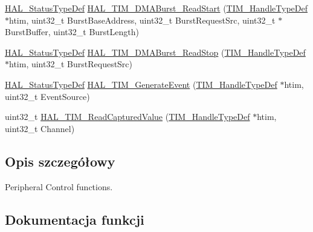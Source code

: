 \begin{DoxyCompactItemize}
\item 
\hyperlink{stm32f4xx__hal__def_8h_a63c0679d1cb8b8c684fbb0632743478f}{H\+A\+L\+\_\+\+Status\+Type\+Def} \hyperlink{group___t_i_m___exported___functions___group8_ga39c612c473747448615e2e3cb2668224}{H\+A\+L\+\_\+\+T\+I\+M\+\_\+\+D\+M\+A\+Burst\+\_\+\+Read\+Start} (\hyperlink{struct_t_i_m___handle_type_def}{T\+I\+M\+\_\+\+Handle\+Type\+Def} $\ast$htim, uint32\+\_\+t Burst\+Base\+Address, uint32\+\_\+t Burst\+Request\+Src, uint32\+\_\+t $\ast$Burst\+Buffer, uint32\+\_\+t Burst\+Length)
\item 
\hyperlink{stm32f4xx__hal__def_8h_a63c0679d1cb8b8c684fbb0632743478f}{H\+A\+L\+\_\+\+Status\+Type\+Def} \hyperlink{group___t_i_m___exported___functions___group8_ga41cfa290ee87229cba1962e78e2a9d01}{H\+A\+L\+\_\+\+T\+I\+M\+\_\+\+D\+M\+A\+Burst\+\_\+\+Read\+Stop} (\hyperlink{struct_t_i_m___handle_type_def}{T\+I\+M\+\_\+\+Handle\+Type\+Def} $\ast$htim, uint32\+\_\+t Burst\+Request\+Src)
\item 
\hyperlink{stm32f4xx__hal__def_8h_a63c0679d1cb8b8c684fbb0632743478f}{H\+A\+L\+\_\+\+Status\+Type\+Def} \hyperlink{group___t_i_m___exported___functions___group8_gab4a60fe7cbb64a321bdce2ee1b9c8730}{H\+A\+L\+\_\+\+T\+I\+M\+\_\+\+Generate\+Event} (\hyperlink{struct_t_i_m___handle_type_def}{T\+I\+M\+\_\+\+Handle\+Type\+Def} $\ast$htim, uint32\+\_\+t Event\+Source)
\item 
uint32\+\_\+t \hyperlink{group___t_i_m___exported___functions___group8_ga6528480e73e4e51d5ce8aaca00d64d13}{H\+A\+L\+\_\+\+T\+I\+M\+\_\+\+Read\+Captured\+Value} (\hyperlink{struct_t_i_m___handle_type_def}{T\+I\+M\+\_\+\+Handle\+Type\+Def} $\ast$htim, uint32\+\_\+t Channel)
\end{DoxyCompactItemize}


\subsection{Opis szczegółowy}
Peripheral Control functions. 



\subsection{Dokumentacja funkcji}
\mbox{\label{group___t_i_m___exported___functions___group8_ga43403d13849f71285ea1da3f3cb1381f}} 
